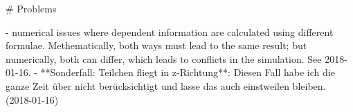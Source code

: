 # Problems

- numerical issues where dependent information are calculated using different formulae. Methematically, both ways must lead to the same result; but numerically, both can differ, which leads to conflicts in the simulation. See 2018-01-16.
- **Sonderfall: Teilchen fliegt in z-Richtung**: Diesen Fall habe ich die ganze Zeit über nicht berücksichtigt und lasse das auch einstweilen bleiben. (2018-01-16)